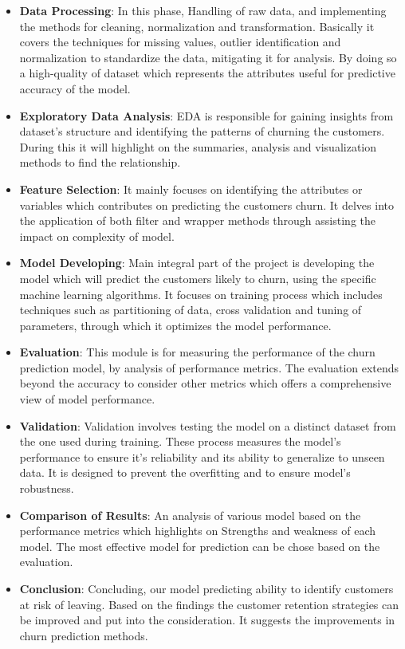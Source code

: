 \documentclass{article}
\begin{document}
\begin{itemize}
    \item \textbf{Data Processing}:
   	In this phase, Handling of raw data, and implementing the methods for cleaning, normalization and transformation. Basically it covers the techniques for missing values, outlier identification and normalization to standardize the data, mitigating it for analysis. By doing so a high-quality of dataset which represents the attributes useful for predictive accuracy of the model.
    \item \textbf{Exploratory Data Analysis}:
    	EDA is responsible for gaining insights from dataset's structure and identifying the patterns of churning the customers. During this it will highlight on the summaries, analysis and visualization methods to find the relationship. 
	
    \item \textbf{Feature Selection}:
    	It mainly focuses on identifying the attributes or variables which contributes on predicting the customers churn. It delves into the application of both filter and wrapper methods through assisting the impact on complexity of model.
	
    \item \textbf{Model Developing}:
    	Main integral part of the project is developing the model which will predict the customers likely to churn, using the specific machine learning algorithms. It focuses on training process which includes techniques such as partitioning of data, cross validation and tuning of parameters, through which it optimizes the model performance.
	
    \item \textbf{Evaluation}:
    	This module is for measuring the performance of the churn prediction model, by analysis of performance metrics. The evaluation extends beyond the accuracy to consider other metrics which offers a comprehensive view of model performance.
	
    \item \textbf{Validation}:
    	Validation involves testing the model on a distinct dataset from the one used during training. These process measures the model's performance to ensure it's reliability and its ability to generalize to unseen data. It is designed to prevent the overfitting and to ensure model's robustness.
	
    \item \textbf{Comparison of Results}:
    	An analysis of various model based on the performance metrics which highlights on Strengths and weakness of each model. The most effective model for prediction can be chose based on the evaluation.
	
    \item \textbf{Conclusion}:
    	Concluding, our model predicting ability to identify customers at risk of leaving. Based on the findings the customer retention strategies can be improved and put into the consideration. It suggests the improvements in churn prediction methods.
\end{itemize}    
\end{document}
